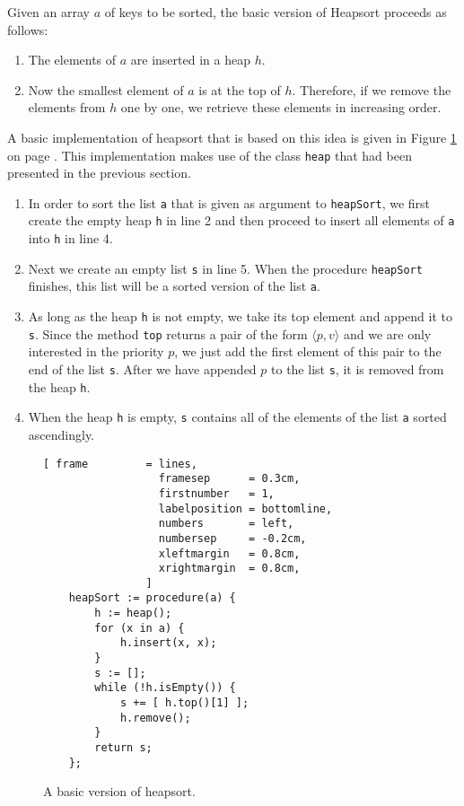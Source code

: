 Given an array $a$ of keys to be sorted, the basic version of Heapsort proceeds as follows:
\begin{enumerate}
\item The elements of $a$ are inserted in a heap $h$.
\item Now the smallest element of $a$ is at the top of $h$.  Therefore, if we remove the elements
      from $h$ one by one, we retrieve these elements in increasing order.
\end{enumerate}
A basic implementation of heapsort that is based on this idea is given in Figure
\ref{fig:basic-heapsort.stlx} on page \pageref{fig:basic-heapsort.stlx}.  This implementation makes
use of the class \texttt{heap} that had been presented in the previous section.
\begin{enumerate}
\item In order to sort the list \texttt{a} that is given as argument to \texttt{heapSort}, we first
      create the empty heap 
      \texttt{h} in line 2 and then proceed to insert all elements of \texttt{a} into \texttt{h} 
      in line 4.
\item Next we create an empty list \texttt{s} in line 5. When the procedure \texttt{heapSort}
      finishes, this list will be a sorted version of the list \texttt{a}.
\item As long as the heap \texttt{h} is not empty, we take its top element and append it to
      \texttt{s}.  Since the method \texttt{top} returns a pair of the form $\langle p, v\rangle$ and
      we are only interested in the priority $p$, we just add the first element of this pair to the
      end of the list \texttt{s}.  After we have appended $p$ to the list \texttt{s}, it is removed
      from the heap \texttt{h}.
\item When the heap \texttt{h} is empty, \texttt{s} contains all of the elements of the list \texttt{a}
      sorted ascendingly.
\end{enumerate}

\begin{figure}[!ht]
\centering
\begin{Verbatim}[ frame         = lines, 
                  framesep      = 0.3cm, 
                  firstnumber   = 1,
                  labelposition = bottomline,
                  numbers       = left,
                  numbersep     = -0.2cm,
                  xleftmargin   = 0.8cm,
                  xrightmargin  = 0.8cm,
                ]
    heapSort := procedure(a) {
        h := heap();    
        for (x in a) {
            h.insert(x, x);
        }
        s := [];
        while (!h.isEmpty()) {
            s += [ h.top()[1] ];
            h.remove();
        }
        return s;
    };
\end{Verbatim}
\vspace*{-0.3cm}
\caption{A basic version of heapsort.}
\label{fig:basic-heapsort.stlx}
\end{figure}

